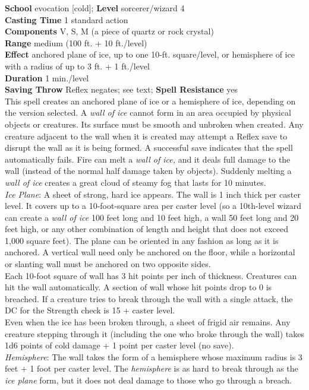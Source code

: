 \textbf{School} evocation [cold]; \textbf{Level} sorcerer/wizard 4\\
\textbf{Casting Time} 1 standard action\\
\textbf{Components} V, S, M (a piece of quartz or rock crystal)\\
\textbf{Range }medium (100 ft. + 10 ft./level)\\
\textbf{Effect} anchored plane of ice, up to one 10-ft. square/level, or hemisphere of ice with a radius of up to 3 ft. + 1 ft./level\\
\textbf{Duration} 1 min./level\\
\textbf{Saving Throw} Reflex negates; see text; \textbf{Spell Resistance} yes\\
This spell creates an anchored plane of ice or a hemisphere of ice, depending on the version selected. A \textit{wall of ice }cannot form in an area occupied by physical objects or creatures. Its surface must be smooth and unbroken when created. Any creature adjacent to the wall when it is created may attempt a Reflex save to disrupt the wall as it is being formed. A successful save indicates that the spell automatically fails. Fire can melt a \textit{wall of ice, }and it deals full damage to the wall (instead of the normal half damage taken by objects). Suddenly melting a \textit{wall of ice }creates a great cloud of steamy fog that lasts for 10 minutes.\\
\textit{Ice Plane}: A sheet of strong, hard ice appears. The wall is 1 inch thick per caster level. It covers up to a 10-foot-square area per caster level (so a 10th-level wizard can create a \textit{wall of ice} 100 feet long and 10 feet high, a wall 50 feet long and 20 feet high, or any other combination of length and height that does not exceed 1,000 square feet). The plane can be oriented in any fashion as long as it is anchored. A vertical wall need only be anchored on the floor, while a horizontal or slanting wall must be anchored on two opposite sides.\\
Each 10-foot square of wall has 3 hit points per inch of thickness. Creatures can hit the wall automatically. A section of wall whose hit points drop to 0 is breached. If a creature tries to break through the wall with a single attack, the DC for the Strength check is 15 + caster level.\\
Even when the ice has been broken through, a sheet of frigid air remains. Any creature stepping through it (including the one who broke through the wall) takes 1d6 points of cold damage + 1 point per caster level (no save).\\
\textit{Hemisphere}: The wall takes the form of a hemisphere whose maximum radius is 3 feet + 1 foot per caster level. The \textit{hemisphere }is as hard to break through as the \textit{ice plane }form, but it does not deal damage to those who go through a breach.\\
